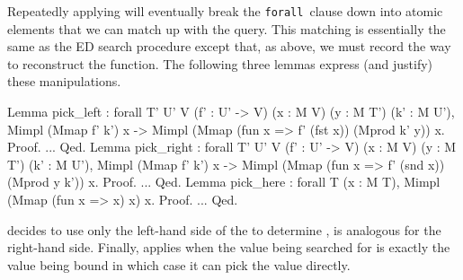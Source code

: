 \documentclass[preprint]{sigplanconf}
\newcommand{\FORALL}{{\tt forall}\relax\ifmmode\ \else\xspace\fi}
\newcommand{\ltac}[0]{\ensuremath{\mathcal{L}_{\mathrm{tac}}}}
\begin{document}
Repeatedly applying  will eventually break the \FORALL clause down into atomic elements that we can match up with the query.
This matching is essentially the same as the ED search procedure except that, as above, we must record the way to reconstruct the  function.
The following three lemmas express (and justify) these manipulations.
\begin{coq}
Lemma pick_left
: forall {T' U' V} (f' : U' -> V) (x : M V) (y : M T') (k' : M U'),
  Mimpl (Mmap f' k') x ->
  Mimpl (Mmap (fun x => f' (fst x)) (Mprod k' y)) x.
Proof. ... Qed.
Lemma pick_right
: forall {T' U' V} (f' : U' -> V) (x : M V) (y : M T') (k' : M U'),
  Mimpl (Mmap f' k') x ->
  Mimpl (Mmap (fun x => f' (snd x)) (Mprod y k')) x.
Proof. ... Qed.
Lemma pick_here
: forall {T} (x : M T), Mimpl (Mmap (fun x => x) x) x.
Proof. ... Qed.
\end{coq}
 decides to use only the left-hand side of the  to determine ,  is analogous for the right-hand side.
Finally,  applies when the value being searched for is exactly the value being bound in which case it can pick the value directly.

\end{document}
